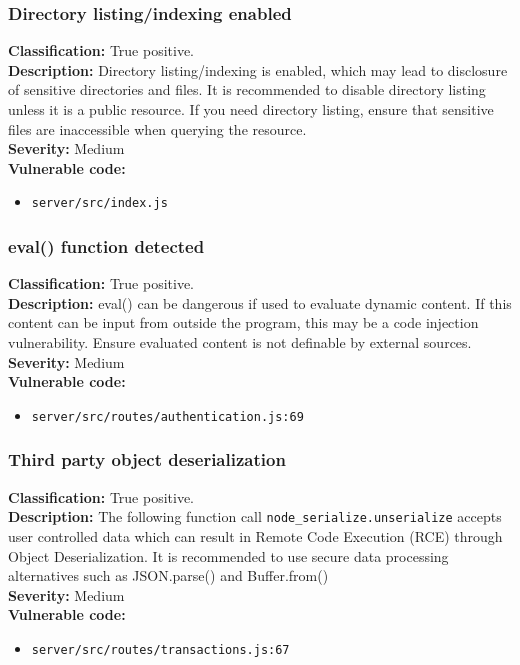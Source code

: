 \documentclass[]{article}
\begin{document}
\subsubsection{Directory listing/indexing enabled}
\textbf{Classification:} {True positive.} \\
\textbf{Description:} Directory listing/indexing is enabled, which may lead to disclosure of sensitive directories and 
          files. It is recommended to disable directory listing unless it is a public resource. If you need
          directory listing, ensure that sensitive files are inaccessible when querying the resource. \\
\textbf{Severity:}  Medium\\ 
\textbf{Vulnerable code:}
\begin{itemize}
    \item \texttt{server/src/index.js}
\end{itemize}

\subsubsection{eval() function detected}
\textbf{Classification:} {True positive.} \\
\textbf{Description:} eval() can be dangerous if used to evaluate dynamic content. If this content can be input from outside the program, this may be a code injection vulnerability. Ensure evaluated content is not definable by external sources. \\ 
\textbf{Severity:} Medium \\ 
\textbf{Vulnerable code:}
\begin{itemize}
    \item \texttt{server/src/routes/authentication.js:69}
\end{itemize}

\subsubsection{Third party object deserialization}
\textbf{Classification:} {True positive.} \\
\textbf{Description:} The following function call \texttt{node\_serialize.unserialize} accepts user controlled data which can result in Remote Code Execution (RCE) through Object Deserialization. It is recommended to use secure data processing alternatives such as JSON.parse() and Buffer.from() \\ 
\textbf{Severity:} Medium \\ 
\textbf{Vulnerable code:}
\begin{itemize}
    \item \texttt{server/src/routes/transactions.js:67}
\end{itemize}
\end{document}
